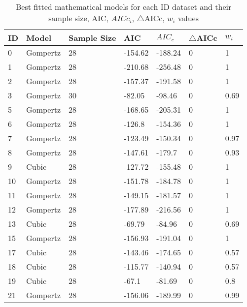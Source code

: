 \documentclass[11pt]{article}
\begin{document}
    \begin{center}
    \begin{longtable}{lllllll}
        \caption{Best fitted mathematical models for each ID dataset and their sample size, AIC, $AICc_{i}$, $\triangle$AICc, $w_{i}$ values }
        \label{table:4}\\
        ID  & Model     & Sample Size & AIC & $AIC_{c}$ & $\triangle$AICc & $w_{i}$    \\
        \midrule
        0   & Gompertz  & 28              & -154.62 & -188.24 & 0       & 1    \\
        1   & Gompertz  & 28              & -210.68 & -256.48 & 0       & 1    \\
        2   & Gompertz  & 28              & -157.37 & -191.58 & 0       & 1    \\
        3   & Gompertz  & 30              & -82.05  & -98.46  & 0       & 0.69 \\
        5   & Gompertz  & 28              & -168.65 & -205.31 & 0       & 1    \\
        6   & Gompertz  & 28              & -126.8  & -154.36 & 0       & 1    \\
        7   & Gompertz  & 28              & -123.49 & -150.34 & 0       & 0.97 \\
        8   & Gompertz  & 28              & -147.61 & -179.7  & 0       & 0.93 \\
        9   & Cubic     & 28              & -127.72 & -155.48 & 0       & 1    \\
        10  & Gompertz  & 28              & -151.78 & -184.78 & 0       & 1    \\
        11  & Gompertz  & 28              & -149.15 & -181.57 & 0       & 1    \\
        12  & Gompertz  & 28              & -177.89 & -216.56 & 0       & 1    \\
        13  & Cubic     & 28              & -69.79  & -84.96  & 0       & 0.69 \\
        15  & Gompertz  & 28              & -156.93 & -191.04 & 0       & 1    \\
        17  & Cubic     & 28              & -143.46 & -174.65 & 0       & 0.57 \\
        18  & Cubic     & 28              & -115.77 & -140.94 & 0       & 0.57 \\
        19  & Cubic     & 28              & -67.1   & -81.69  & 0       & 0.8  \\
        21  & Gompertz  & 28              & -156.06 & -189.99 & 0       & 0.99 \\

\end{longtable}
\end{center}
\end{document}
